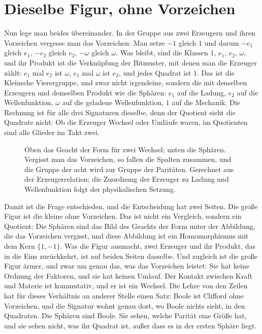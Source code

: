 \documentclass[11pt,a4paper]{article}
\begin{document}
\section{Dieselbe Figur, ohne Vorzeichen}
\label{sec:quotient}

Nun lege man beides übereinander. In der Gruppe aus zwei Erzeugern und ihren Vorzeichen vergesse man das Vorzeichen: Man setze $-1$ gleich $1$ und darum $-e_1$ gleich $e_1$, $-e_2$ gleich $e_2$, $-\omega$ gleich $\omega$. Was bleibt, sind die Klassen $1$, $e_1$, $e_2$, $\omega$, und ihr Produkt ist die Verknüpfung der Bitmuster, mit denen man die Erzeuger zählt: $e_1$ mal $e_2$ ist $\omega$, $e_1$ mal $\omega$ ist $e_2$, und jedes Quadrat ist $1$. Das ist die Kleinsche Vierergruppe, und zwar nicht irgendeine, sondern die mit denselben Erzeugern und demselben Produkt wie die Sphären: $e_1$ auf die Ladung, $e_2$ auf die Wellenfunktion, $\omega$ auf die geladene Wellenfunktion, $1$ auf die Mechanik. Die Rechnung ist für alle drei Signaturen dieselbe, denn der Quotient sieht die Quadrate nicht: Ob die Erzeuger Wechsel oder Umläufe waren, im Quotienten sind alle Glieder im Takt zwei.

\begin{figure}[h]
\centering

\caption[Das Geacht der Form und die Sphären]{Oben das Geacht der Form für zwei Wechsel; unten die Sphären. Vergisst man das Vorzeichen, so fallen die Spalten zusammen, und die Gruppe der acht wird zur Gruppe der Paritäten. Gerechnet aus der Erzeugerrelation; die Zuordnung der Erzeuger zu Ladung und Wellenfunktion folgt der physikalischen Setzung.}
\label{fig:quotient}
\end{figure}

Damit ist die Frage entschieden, und die Entscheidung hat zwei Seiten. Die große Figur ist die kleine ohne Vorzeichen. Das ist nicht ein Vergleich, sondern ein Quotient: Die Sphären sind das Bild des Geachts der Form unter der Abbildung, die das Vorzeichen vergisst, und diese Abbildung ist ein Homomorphismus mit dem Kern $\{1,-1\}$. Was die Figur ausmacht, zwei Erzeuger und ihr Produkt, das in die Eins zurückkehrt, ist auf beiden Seiten dasselbe. Und zugleich ist die große Figur ärmer, und zwar um genau das, was das Vorzeichen leistet: Sie hat keine Ordnung der Faktoren, und sie hat keinen Umlauf. Der Kontakt zwischen Kraft und Materie ist kommutativ, und er ist ein Wechsel. Die Lehre von den Zeilen hat für dieses Verhältnis an anderer Stelle einen Satz: Boole ist Clifford ohne Vorzeichen, und die Signatur wohnt genau dort, wo Boole nichts sieht, in den Quadraten. Die Sphären sind Boole. Sie sehen, welche Parität eine Größe hat, und sie sehen nicht, was ihr Quadrat ist, außer dass es in der ersten Sphäre liegt.
\end{document}
